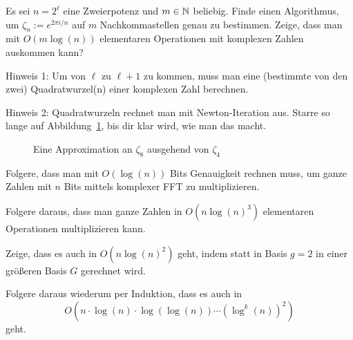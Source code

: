 \begin{sheet}
    \begin{problem}
        Es sei $n=2^\ell$ eine Zweierpotenz und $m\in\mathbb{N}$ beliebig. Finde einen Algorithmus, um $\zeta_n:=e^{2\pi i/n}$ auf $m$ Nachkommastellen genau zu bestimmen. Zeige, dass man mit $O(m\log(n))$ elementaren Operationen mit komplexen Zahlen auskommen kann?

        \smallskip
        Hinweis 1: Um von $\ell$ zu $\ell+1$ zu kommen, muss man eine (bestimmte von den zwei) Quadratwurzel(n) einer komplexen Zahl berechnen.

        Hinweis 2: Quadratwurzeln rechnet man mit Newton-Iteration aus. Starre so lange auf Abbildung~\ref{fig:fft:approximation_zeta_8}, bis dir klar wird, wie man das macht.

        \begin{figure}[ht]
            \centering
            \caption{Eine Approximation an $\zeta_8$ ausgehend von $\zeta_4$}
            \label{fig:fft:approximation_zeta_8}
        \end{figure}
    \end{problem}

    \begin{problem}[title={Schönhage-Strassen I}]
        \begin{subproblem}
            Folgere, dass man mit $O(\log(n))$ Bits Genauigkeit rechnen muss, um ganze Zahlen mit $n$ Bits mittels komplexer FFT zu multiplizieren.
        \end{subproblem}
        \begin{subproblem}
            Folgere daraus, dass man ganze Zahlen in $O(n\log(n)^3)$ elementaren Operationen multiplizieren kann.
        \end{subproblem}
        \begin{subproblem}
            Zeige, dass es auch in $O(n\log(n)^2)$ geht, indem statt in Basis $g=2$ in einer größeren Basis $G$ gerechnet wird.
        \end{subproblem}
        \begin{subproblem}
            Folgere daraus wiederum per Induktion, dass es auch in
            \[O(n\cdot\log(n)\cdot \log(\log(n)) \cdots (\log^k(n))^2)\]
            geht.
        \end{subproblem}
    \end{problem}
\end{sheet}